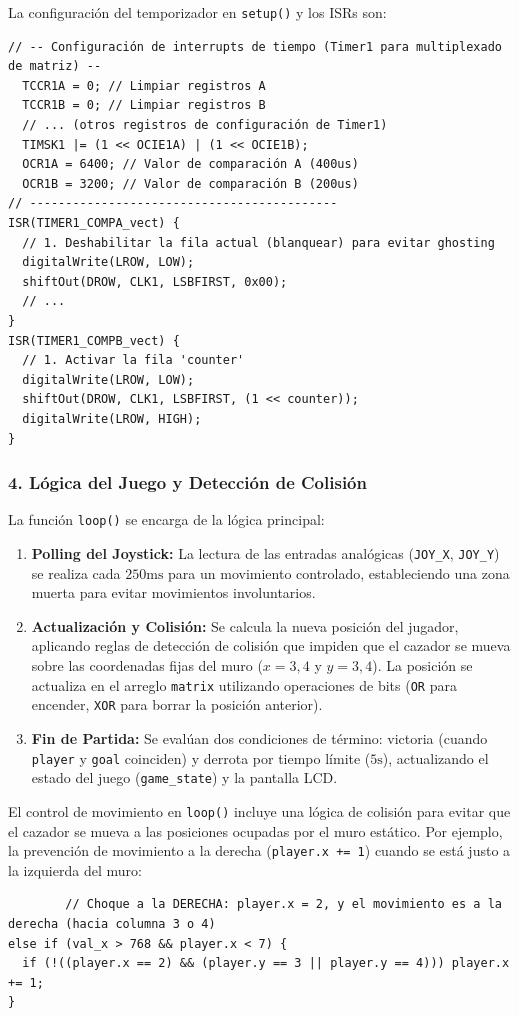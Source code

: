La configuración del temporizador en \texttt{setup()} y los ISRs son:


    \begin{verbatim}
// -- Configuración de interrupts de tiempo (Timer1 para multiplexado de matriz) --
  TCCR1A = 0; // Limpiar registros A
  TCCR1B = 0; // Limpiar registros B
  // ... (otros registros de configuración de Timer1)
  TIMSK1 |= (1 << OCIE1A) | (1 << OCIE1B);
  OCR1A = 6400; // Valor de comparación A (400us)
  OCR1B = 3200; // Valor de comparación B (200us)
// -------------------------------------------
ISR(TIMER1_COMPA_vect) {
  // 1. Deshabilitar la fila actual (blanquear) para evitar ghosting
  digitalWrite(LROW, LOW);
  shiftOut(DROW, CLK1, LSBFIRST, 0x00);
  // ...
}
ISR(TIMER1_COMPB_vect) {
  // 1. Activar la fila 'counter' 
  digitalWrite(LROW, LOW);
  shiftOut(DROW, CLK1, LSBFIRST, (1 << counter));
  digitalWrite(LROW, HIGH);
}
    \end{verbatim}


\subsubsection*{4. Lógica del Juego y Detección de Colisión}

La función \texttt{loop()} se encarga de la lógica principal:

\vspace{1em}
\begin{enumerate}
    \item \textbf{Polling del Joystick:} La lectura de las entradas analógicas (\texttt{JOY\_X}, \texttt{JOY\_Y}) se realiza cada $250\text{ms}$ para un movimiento controlado, estableciendo una zona muerta para evitar movimientos involuntarios.
    \item \textbf{Actualización y Colisión:} Se calcula la nueva posición del jugador, aplicando reglas de detección de colisión que impiden que el cazador se mueva sobre las coordenadas fijas del muro ($x=3, 4$ y $y=3, 4$). La posición se actualiza en el arreglo \texttt{matrix} utilizando operaciones de bits (\texttt{OR} para encender, \texttt{XOR} para borrar la posición anterior).
    \item \textbf{Fin de Partida:} Se evalúan dos condiciones de término: victoria (cuando \texttt{player} y \texttt{goal} coinciden) y derrota por tiempo límite ($5\text{s}$), actualizando el estado del juego (\texttt{game\_state}) y la pantalla LCD.
\end{enumerate}

El control de movimiento en \texttt{loop()} incluye una lógica de colisión para evitar que el cazador se mueva a las posiciones ocupadas por el muro estático. Por ejemplo, la prevención de movimiento a la derecha (\texttt{player.x += 1}) cuando se está justo a la izquierda del muro:

    \begin{verbatim}
        // Choque a la DERECHA: player.x = 2, y el movimiento es a la derecha (hacia columna 3 o 4)
else if (val_x > 768 && player.x < 7) { 
  if (!((player.x == 2) && (player.y == 3 || player.y == 4))) player.x += 1;
}
    \end{verbatim}


